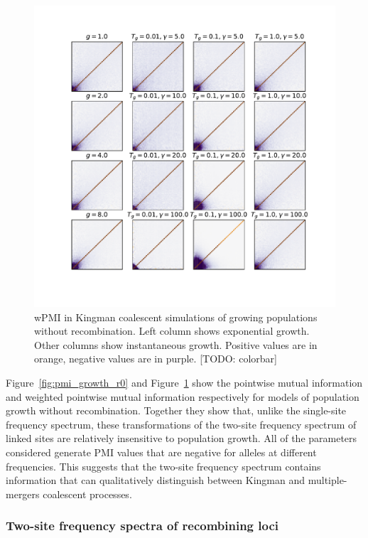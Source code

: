 \documentclass[11pt, letterpaper]{article}   	%
\newcommand{\Fig}[1]{Figure~\ref{#1}}
\begin{document}
\begin{figure}
\centering
\includegraphics[width=\textwidth]{figures/wpmi_growth_r0.pdf}
\caption{wPMI in Kingman coalescent simulations of growing populations without recombination. Left column shows exponential growth. Other columns show instantaneous growth. Positive values are in orange, negative values are in purple. [TODO: colorbar]\label{fig:wpmi_growth_r0}}
\end{figure}

\Fig{fig:pmi_growth_r0} and \Fig{fig:wpmi_growth_r0} show the pointwise mutual information and weighted pointwise mutual information respectively for models of population growth without recombination.
Together they show that, unlike the single-site frequency spectrum, these transformations of the two-site frequency spectrum of linked sites are relatively insensitive to population growth.
All of the parameters considered generate PMI values that are negative for alleles at different frequencies.
This suggests that the two-site frequency spectrum contains information that can qualitatively distinguish between Kingman and multiple-mergers coalescent processes.

\subsubsection{Two-site frequency spectra of recombining loci}
\end{document}
